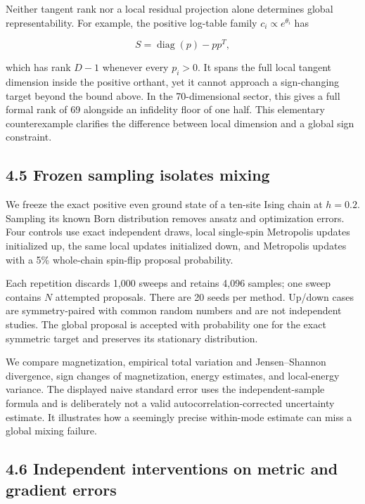 \documentclass[
  11pt,
  a4paper,
]{article}
\begin{document}
Neither tangent rank nor a local residual projection alone determines
global representability. For example, the positive log-table family
\(c_i\propto e^{\theta_i}\) has

\[S=\operatorname{diag}(p)-pp^T,\]

which has rank \(D-1\) whenever every \(p_i>0\). It spans the full local
tangent dimension inside the positive orthant, yet it cannot approach a
sign-changing target beyond the bound above. In the 70-dimensional
sector, this gives a full formal rank of 69 alongside an infidelity
floor of one half. This elementary counterexample clarifies the
difference between local dimension and a global sign constraint.

\hypertarget{frozen-sampling-isolates-mixing}{%
\subsection{4.5 Frozen sampling isolates
mixing}\label{frozen-sampling-isolates-mixing}}

We freeze the exact positive even ground state of a ten-site Ising chain
at \(h=0.2\). Sampling its known Born distribution removes ansatz and
optimization errors. Four controls use exact independent draws, local
single-spin Metropolis updates initialized up, the same local updates
initialized down, and Metropolis updates with a 5\% whole-chain
spin-flip proposal probability.

Each repetition discards 1,000 sweeps and retains 4,096 samples; one
sweep contains \(N\) attempted proposals. There are 20 seeds per method.
Up/down cases are symmetry-paired with common random numbers and are not
independent studies. The global proposal is accepted with probability
one for the exact symmetric target and preserves its stationary
distribution.

We compare magnetization, empirical total variation and Jensen--Shannon
divergence, sign changes of magnetization, energy estimates, and
local-energy variance. The displayed naive standard error uses the
independent-sample formula and is deliberately not a valid
autocorrelation-corrected uncertainty estimate. It illustrates how a
seemingly precise within-mode estimate can miss a global mixing failure.

\hypertarget{independent-interventions-on-metric-and-gradient-errors}{%
\subsection{4.6 Independent interventions on metric and gradient
errors}\label{independent-interventions-on-metric-and-gradient-errors}}
\end{document}
